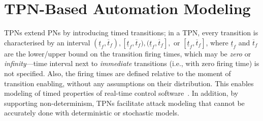 

\section{TPN-Based  Automation Modeling} %
\label{sec:modeling}

TPNs extend PNs by introducing timed transitions; in a TPN, every transition is characterised by an interval $(\underline{t}_f,\overline{t}_f),[\underline{t}_f,\overline{t}_f),(\underline{t}_f,\overline{t}_f],$ or $[\underline{t}_f,\overline{t}_f]$, where $\underline{t}_f$ and $\overline{t}_f$ are the lower/upper bound on the transition firing times, %
which may be \emph{zero} or \emph{infinity}---time interval next to \emph{immediate} transitions (i.e., with zero firing time) is not specified.
Also, %
the firing times are defined relative to the moment of transition enabling, without any assumptions %
on their distribution. %
This enables modeling of timed properties of real-time control software~\cite{TPNforRT1,TPNforRT2,TPNforRT3}.
In addition, by supporting non-determinism, TPNs facilitate attack modeling %
that cannot be accurately done with deterministic or stochastic models. %


